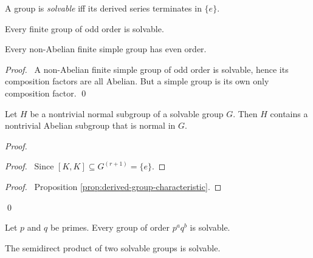 \begin{df}[Solvable]
A group is \emph{solvable} iff its derived series terminates in $\{e\}$.
\end{df}

\begin{thm}
Every finite group of odd order is solvable.
\end{thm}


\begin{cor}
Every non-Abelian finite simple group has even order.
\end{cor}

\begin{proof}
\pf\ A non-Abelian finite simple group of odd order is solvable, hence its composition factors are all Abelian. But a simple group is its own only composition factor. \qed
\end{proof}

\begin{prop}
Let $H$ be a nontrivial normal subgroup of a solvable group $G$. Then $H$ contains a nontrivial Abelian subgroup that is normal in $G$.
\end{prop}

\begin{proof}
\pf
{}
\begin{proof}
	\pf\ Since $[K,K] \subseteq G^{(r+1)} = \{e\}$.
\end{proof}
\begin{proof}
	\pf\ Proposition \ref{prop:derived-group-characteristic}.
\end{proof}
\qed
\end{proof}

\begin{thm}[Burnside]
Let $p$ and $q$ be primes. Every group of order $p^a q^b$ is solvable.
\end{thm}


\begin{prop}
The semidirect product of two solvable groups is solvable.
\end{prop}

